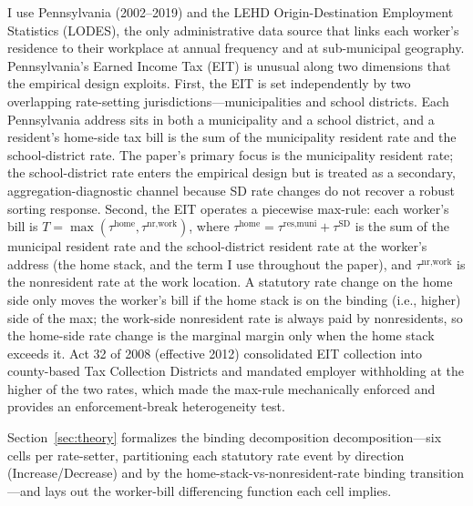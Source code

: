 \documentclass[12pt]{article}
\begin{document}
I use Pennsylvania (2002--2019) and the LEHD Origin-Destination
Employment Statistics (LODES), the only administrative data source
that links each worker's residence to their workplace at annual
frequency and at sub-municipal geography. Pennsylvania's Earned
Income Tax (EIT) is unusual along two dimensions that the empirical
design exploits. First, the EIT is set independently by two
overlapping rate-setting jurisdictions---municipalities and school
districts. Each Pennsylvania address sits in both a municipality and a
school district, and a resident's home-side tax bill is the sum of
the municipality resident rate and the school-district rate. The paper's
primary focus is the municipality resident rate; the school-district rate
enters the empirical design but is treated as a secondary,
aggregation-diagnostic channel because SD rate changes do not
recover a robust sorting response. Second, the EIT operates a
piecewise max-rule: each worker's bill is
$T = \max(\tau^{\text{home}}, \tau^{\text{nr,work}})$, where
$\tau^{\text{home}} = \tau^{\text{res,muni}} + \tau^{\text{SD}}$ is
the sum of the municipal resident rate and the school-district
resident rate at the worker's address (the home stack, and
the term I use throughout the paper), and $\tau^{\text{nr,work}}$
is the nonresident rate at the work location. A statutory rate change on
the home side only moves the worker's bill if the home stack is on
the binding (i.e., higher) side of the max; the work-side
nonresident rate is always paid by nonresidents, so the home-side
rate change is the marginal margin only when the home stack
exceeds it. Act 32 of 2008 (effective 2012) consolidated EIT
collection into county-based Tax Collection Districts and mandated
employer withholding at the higher of the two rates, which made
the max-rule mechanically enforced and provides an enforcement-break
heterogeneity test.

Section~\ref{sec:theory} formalizes the binding decomposition
decomposition---six cells per rate-setter, partitioning each
statutory rate event by direction (Increase/Decrease) and by the
home-stack-vs-nonresident-rate binding transition---and lays out the
worker-bill differencing function each cell implies.
\end{document}
